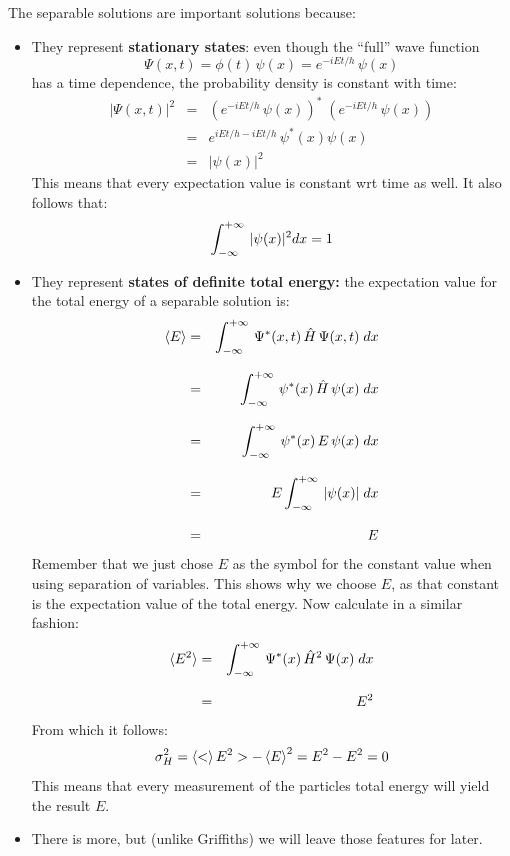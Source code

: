 \documentclass[12pt]{book}
\begin{document}
\noindent
The separable solutions are important solutions because:
\begin{itemize}
\item They represent {\bf stationary states}:  even though the ``full'' wave function
\begin{equation*}
\Psi(x,t) = \phi(t) \, \psi(x) = e^{-iEt/h} \, \psi(x)
\end{equation*}
has a time dependence, the probability density is constant with time:
\begin{eqnarray*}
|\Psi(x,t)|^2 &=& \left(e^{-iEt/h} \, \psi(x)\right)^* \; \left(e^{-iEt/h} \, \psi(x)\right)\\[8pt]
&=& e^{iEt/h-iEt/h} \, \psi^*(x) \psi(x)\\[8pt]
&=& | \psi(x) |^2
\end{eqnarray*}
This means that every expectation value is constant wrt time as well.  It also follows that:
\begin{equation*}
\int_{-\infty}^{+\infty}\, |\psi(x)|^2 dx = 1\\
\end{equation*}


\item They represent {\bf states of definite total energy:} the expectation value for the total energy of a separable solution is:
\begin{eqnarray*}
\braket{E} &=& \int_{-\infty}^{+\infty}\, \Psi^*(x,t) \, \hat{H} \, \Psi(x,t) \; dx \\[8pt]
           &=& \int_{-\infty}^{+\infty}\, \psi^*(x) \, \hat{H} \, \psi(x) \; dx \\[8pt]
           &=& \int_{-\infty}^{+\infty}\, \psi^*(x) \, E \, \psi(x) \; dx \\[8pt]
           &=& E \int_{-\infty}^{+\infty}\, |\psi(x)| \; dx \\[8pt]
           &=& E           
\end{eqnarray*}
Remember that we just chose $E$ as the symbol for the constant value when using separation of variables.  This shows why we choose $E$, as that constant is the expectation value of the total energy.  Now calculate in a similar fashion:
\begin{eqnarray*}
\braket{E^2} &=& \int_{-\infty}^{+\infty}\, \Psi^*(x) \, \hat{H}^2 \, \Psi(x) \; dx \\[8pt]
           &=& E^2
\end{eqnarray*}
From which it follows:
\begin{equation*}
\sigma^2_H = \braket<E^2> - \braket{E}^2 = E^2 - E^2 = 0
\end{equation*}
This means that every measurement of the particles total energy will yield the result $E$.
\item There is more, but (unlike Griffiths) we will leave those features for later.
\end{itemize}
\end{document}
